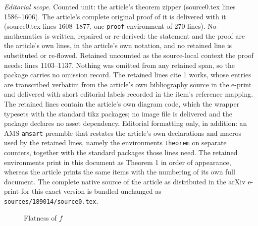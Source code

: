 \documentclass[10pt,a4paper]{amsart}
\begin{document}
\noindent\textit{Editorial scope.} Counted unit: the article's theorem zipper (source0.tex lines 1586--1606). The article's complete original proof of it is delivered with it (source0.tex lines 1608--1877, one \texttt{proof} environment of 270 lines). No mathematics is written, repaired or re-derived: the statement and the proof are the article's own lines, in the article's own notation, and no retained line is substituted or re-flowed.  Retained uncounted as the source-local context the proof needs: lines 1103--1137.  Nothing was omitted from any retained span, so the package carries no omission record.  The retained lines cite 1 works, whose entries are transcribed verbatim from the article's own bibliography source in the e-print and delivered with short editorial labels recorded in the item's reference mapping.  The retained lines contain the article's own diagram code, which the wrapper typesets with the standard tikz packages; no image file is delivered and the package declares no asset dependency.  Editorial formatting only, in addition: an AMS \texttt{amsart} preamble that restates the article's own declarations and macros used by the retained lines, namely the environments \texttt{theorem} on separate counters, together with the standard packages those lines need.  The retained environments print in this document as Theorem 1 in order of appearance, whereas the article prints the same items with the numbering of its own full document.  The complete native source of the article as distributed in the arXiv e-print for this exact version is bundled unchanged as \texttt{sources/189014/source0.tex}.
\begin{figure}[H]
\begin{center}
\caption{Flatness of $f$}
\label{flatf}
\end{center}
\end{figure}
\end{document}
